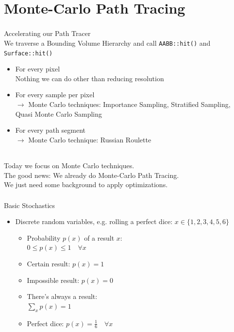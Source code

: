 \documentclass[utf8,stillsansserifmath,fleqn,t]{beamer}
\newcommand{\code}[1]{\texttt{#1}}
\begin{document}
\section{Monte-Carlo Path Tracing}


\begin{frame}[label=acceleration-3]
\frametitle{\insertsection}
Accelerating our Path Tracer\\[1ex]
We traverse a Bounding Volume Hierarchy and call \code{AABB::hit()} and \code{Surface::hit()}
\begin{itemize}
\item For every pixel\\
    Nothing we can do other than reducing resolution
\item For every sample per pixel\\
    $\rightarrow$ Monte Carlo techniques: Importance Sampling, Stratified Sampling, Quasi Monte Carlo Sampling
\item For every path segment\\
    $\rightarrow$ Monte Carlo technique: Russian Roulette
\end{itemize}
~\\
Today we focus on Monte Carlo techniques.\\
The good news: We already do Monte-Carlo Path Tracing.\\
We just need some background to apply optimizations.
\end{frame}

\begin{frame}
\frametitle{\insertsection}
Basic Stochastics
\begin{itemize}
\item Discrete random variables, e.g. rolling a perfect dice: $x \in \{1, 2, 3, 4, 5, 6\}$
\begin{itemize}
\item Probability $p(x)$ of a result $x$:\\
    $\displaystyle 0 \leq p(x) \leq 1 \quad \forall x$
\item Certain result: $p(x) = 1$
\item Impossible result: $p(x) = 0$
\item There's always a result:\\
    $\displaystyle \sum_x p(x) = 1$
\item Perfect dice: $p(x) = \frac{1}{6} \quad \forall x$
\end{itemize}
\end{itemize}
\end{frame}
\end{document}
